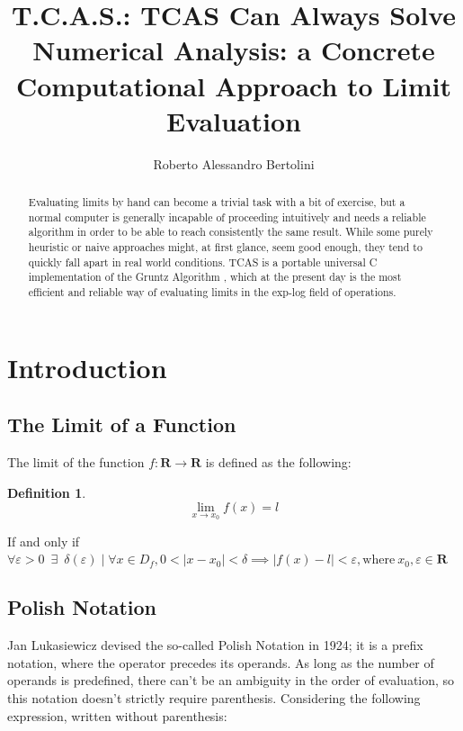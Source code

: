 \documentclass{article}
\title{\textbf{T.C.A.S.}: \textbf{T}CAS \textbf{C}an \textbf{A}lways \textbf{S}olve \\
	\large Numerical Analysis: a Concrete Computational Approach to Limit Evaluation}
\author{Roberto Alessandro Bertolini}
\date{}
\affil{Liceo Nervi Ferrari - Morbegno}
\theoremstyle{plain}
\theoremstyle{definition}
\newtheorem*{defn*}{Definition}
\theoremstyle{algorithm}
\begin{document}
	\maketitle
	
	\begin{abstract}
		Evaluating limits by hand can become a trivial task with a bit of exercise, but a normal computer is generally incapable of proceeding intuitively and needs a reliable algorithm in order to be able to reach consistently the same result. 
		While some purely heuristic or naive approaches might, at first glance, seem good enough, they tend to quickly fall apart in real world conditions. TCAS is a portable universal C implementation of the Gruntz Algorithm \cite{gruntz}, which at the present day is the most efficient and reliable way of evaluating limits in the exp-log field of operations.
	\end{abstract}
	
	\tableofcontents
	
	\newpage	
	
	\section{Introduction}
	
	\subsection{The Limit of a Function}
	
	The limit of the function $ f: \mathbf{R} \rightarrow \mathbf{R} $ is defined as the following:
	
	\begin{defn*}
		\[ 
		\lim_{x \to x_{0}}{f(x) = l} 
		\]
		
		If and only if \( 
		\forall \varepsilon > 0 \enspace \exists \enspace \delta(\varepsilon) \mid \forall x \in D_{f}, 0 < \mid x - x_{0} \mid < \delta \implies \mid f(x) - l \mid < \varepsilon, \text{where} \: x_{0}, \varepsilon \in \mathbf{R}
		\)
	\end{defn*}
	
	\subsection{Polish Notation} \label{sec:pn}
	
	Jan Lukasiewicz devised the so-called Polish Notation \cite{wiki:polish} in 1924; it is a prefix notation, where the operator precedes its operands.
	As long as the number of operands is predefined, there can't be an ambiguity in the order of evaluation, so this notation doesn't strictly require parenthesis.
	Considering the following expression, written without parenthesis:
	
\end{document}
